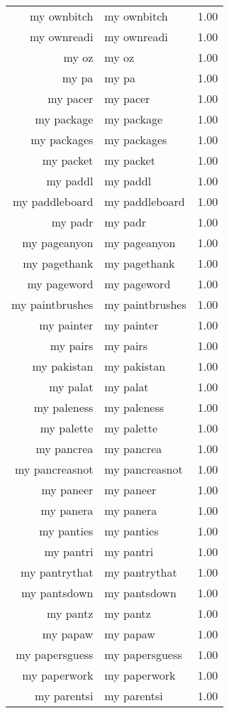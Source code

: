 \begin{table}[ht]
\begin{tabular}{rlr}
  my ownbitch & my ownbitch & 1.00 \\ 
  my ownreadi & my ownreadi & 1.00 \\ 
  my oz & my oz & 1.00 \\ 
  my pa & my pa & 1.00 \\ 
  my pacer & my pacer & 1.00 \\ 
  my package & my package & 1.00 \\ 
  my packages & my packages & 1.00 \\ 
  my packet & my packet & 1.00 \\ 
  my paddl & my paddl & 1.00 \\ 
  my paddleboard & my paddleboard & 1.00 \\ 
  my padr & my padr & 1.00 \\ 
  my pageanyon & my pageanyon & 1.00 \\ 
  my pagethank & my pagethank & 1.00 \\ 
  my pageword & my pageword & 1.00 \\ 
  my paintbrushes & my paintbrushes & 1.00 \\ 
  my painter & my painter & 1.00 \\ 
  my pairs & my pairs & 1.00 \\ 
  my pakistan & my pakistan & 1.00 \\ 
  my palat & my palat & 1.00 \\ 
  my paleness & my paleness & 1.00 \\ 
  my palette & my palette & 1.00 \\ 
  my pancrea & my pancrea & 1.00 \\ 
  my pancreasnot & my pancreasnot & 1.00 \\ 
  my paneer & my paneer & 1.00 \\ 
  my panera & my panera & 1.00 \\ 
  my panties & my panties & 1.00 \\ 
  my pantri & my pantri & 1.00 \\ 
  my pantrythat & my pantrythat & 1.00 \\ 
  my pantsdown & my pantsdown & 1.00 \\ 
  my pantz & my pantz & 1.00 \\ 
  my papaw & my papaw & 1.00 \\ 
  my papersguess & my papersguess & 1.00 \\ 
  my paperwork & my paperwork & 1.00 \\ 
  my parentsi & my parentsi & 1.00 \\ 

\end{tabular}
\end{table}
